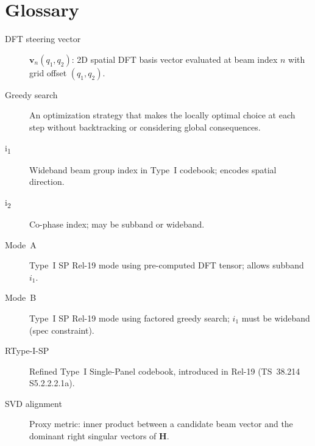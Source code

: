 \documentclass[12pt, a4paper]{article}
\newcommand{\bH}{\mathbf{H}}
\newcommand{\bv}{\mathbf{v}}
\begin{document}
\appendix
\section{Glossary}

\begin{description}
    \item[DFT steering vector] $\bv_n(q_1,q_2)$: 2D spatial DFT basis vector
        evaluated at beam index $n$ with grid offset $(q_1, q_2)$.
    \item[Greedy search] An optimization strategy that makes the locally optimal
        choice at each step without backtracking or considering global consequences.
    \item[i\textsubscript{1}] Wideband beam group index in Type~I codebook;
        encodes spatial direction.
    \item[i\textsubscript{2}] Co-phase index; may be subband or wideband.
    \item[Mode~A] Type~I SP Rel-19 mode using pre-computed DFT tensor;
        allows subband $i_1$.
    \item[Mode~B] Type~I SP Rel-19 mode using factored greedy search;
        $i_1$ must be wideband (spec constraint).
    \item[RType-I-SP] Refined Type~I Single-Panel codebook, introduced in Rel-19
        (TS~38.214 S5.2.2.2.1a).
    \item[SVD alignment] Proxy metric: inner product between a candidate beam vector
        and the dominant right singular vectors of $\bH$.
\end{description}
\end{document}
